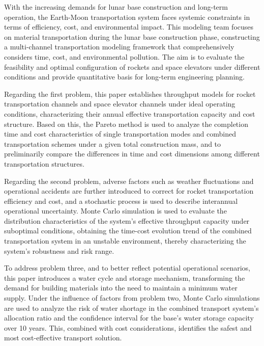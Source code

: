\documentclass[12pt]{article}
\begin{document}
\begin{center}

With the increasing demands for lunar base construction and long-term operation, the Earth-Moon transportation system faces systemic constraints in terms of efficiency, cost, and environmental impact. This modeling team focuses on material transportation during the lunar base construction phase, constructing a multi-channel transportation modeling framework that comprehensively considers time, cost, and environmental pollution. The aim is to evaluate the feasibility and optimal configuration of rockets and space elevators under different conditions and provide quantitative basis for long-term engineering planning.

Regarding the first problem, this paper establishes throughput models for rocket transportation channels and space elevator channels under ideal operating conditions, characterizing their annual effective transportation capacity and cost structure. Based on this, the Pareto method is used to analyze the completion time and cost characteristics of single transportation modes and combined transportation schemes under a given total construction mass, and to preliminarily compare the differences in time and cost dimensions among different transportation structures.

Regarding the second problem, adverse factors such as weather fluctuations and operational accidents are further introduced to correct for rocket transportation efficiency and cost, and a stochastic process is used to describe interannual operational uncertainty. Monte Carlo simulation is used to evaluate the distribution characteristics of the system's effective throughput capacity under suboptimal conditions, obtaining the time-cost evolution trend of the combined transportation system in an unstable environment, thereby characterizing the system's robustness and risk range.

To address problem three, and to better reflect potential operational scenarios, this paper introduces a water cycle and storage mechanism, transforming the demand for building materials into the need to maintain a minimum water supply. Under the influence of factors from problem two, Monte Carlo simulations are used to analyze the risk of water shortage in the combined transport system's allocation ratio and the confidence interval for the base's water storage capacity over 10 years. This, combined with cost considerations, identifies the safest and most cost-effective transport solution.


\end{center}
\end{document}
